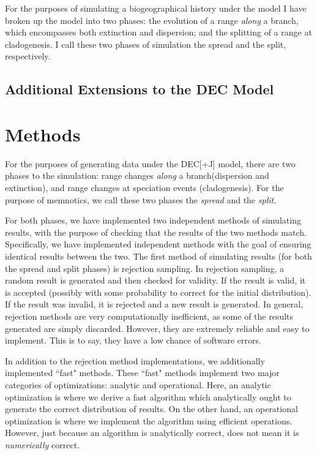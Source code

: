 \documentclass{article}
\begin{document}
For the purposes of simulating a biogeographical history under the \decj{}
model I have broken up the model into two phases: the evolution of a range
\textit{along} a branch, which encompasses both extinction and dispersion; and
the splitting of a range at cladogenesis.
I call these two phases of simulation the spread and the split, respectively.

\subsection{Additional Extensions to the DEC Model}

\section{Methods}

For the purposes of generating data under the DEC[+J] model, there are two
phases to the simulation: range changes \textit{along} a branch(dispersion and
extinction), and range changes at speciation events (cladogenesis).
For the purpose of memnotics, we call these two phases the \textit{spread} and
the \textit{split}.

For both phases, we have implemented two independent methods of simulating
results, with the purpose of checking that the results of the two methods match.
Specifically, we have implemented independent methods with the goal of ensuring
identical results between the two.
The first method of simulating results (for both the spread and split phases) is
rejection sampling.
In rejection sampling, a random result is generated and then checked for
validity.
If the result is valid, it is accepted (possibly with some probability to
correct for the initial distribution).
If the result was invalid, it is rejected and a new result is generated.
In general, rejection methods are very computationally inefficient, as some of
the results generated are simply discarded. 
However, they are extremely reliable and easy to implement.
This is to say, they have a low chance of software errors.

In addition to the rejection method implementations, we additionally implemented 
``fast" methods.
These ``fast" methods implement two major categories of optimizations: analytic
and operational.
Here, an analytic optimization is where we derive a fast algorithm which
analytically ought to generate the correct distribution of results.
On the other hand, an operational optimization is where we implement the
algorithm using efficient operations.
However, just because an algorithm is analytically correct, does not mean it is
\textit{numerically} correct\cite{goldberg_what_1991, noauthor_ieee_1985}.
\end{document}
